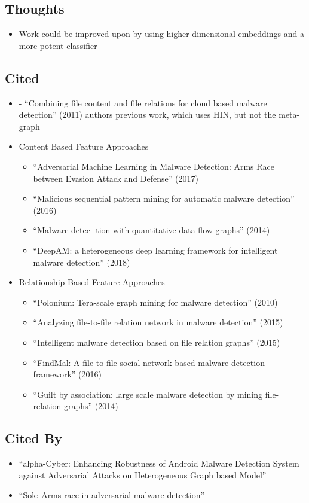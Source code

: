 \documentclass{article}
\begin{document}
\subsection*{Thoughts}
\begin{itemize}
	\item Work could be improved upon by using higher dimensional embeddings and a more potent classifier
\end{itemize}

\subsection*{Cited}
\begin{itemize}
	\item - ``Combining file content and file relations for cloud based malware detection'' (2011) authors previous work, which uses HIN, but not the meta-graph 
	\item Content Based Feature Approaches
	\begin{itemize}
		\item ``Adversarial Machine Learning in Malware Detection: Arms Race between Evasion Attack and Defense'' (2017)
		\item ``Malicious sequential pattern mining for automatic malware detection'' (2016)
		\item ``Malware detec- tion with quantitative data flow graphs'' (2014)
		\item ``DeepAM: a heterogeneous deep learning framework for intelligent malware detection'' (2018)
	\end{itemize}
	\item Relationship Based Feature Approaches
	\begin{itemize}
		\item ``Polonium: Tera-scale graph mining for malware detection'' (2010)
		\item ``Analyzing file-to-file relation network in malware detection'' (2015)
		\item ``Intelligent malware detection based on file relation graphs'' (2015)
		\item ``FindMal: A file-to-file social network based malware detection framework'' (2016)
		\item ``Guilt by association: large scale malware detection by mining file-relation graphs'' (2014)
	\end{itemize}
\end{itemize}

\subsection*{Cited By}
\begin{itemize}
\item ``alpha-Cyber: Enhancing Robustness of Android Malware Detection System against Adversarial Attacks on Heterogeneous Graph based Model''
\item ``Sok: Arms race in adversarial malware detection''
\end{itemize}
\end{document}
